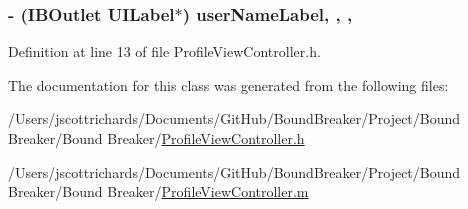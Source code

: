\subsubsection[{user\+Name\+Label}]{\setlength{\rightskip}{0pt plus 5cm}-\/ (I\+B\+Outlet U\+I\+Label$\ast$) user\+Name\+Label\hspace{0.3cm}{\ttfamily [read]}, {\ttfamily [write]}, {\ttfamily [nonatomic]}, {\ttfamily [weak]}}\label{interface_profile_view_controller_ad53862803c533a8fa1a4f99299db3424}


Definition at line 13 of file Profile\+View\+Controller.\+h.



The documentation for this class was generated from the following files\+:\begin{DoxyCompactItemize}
\item 
/\+Users/jscottrichards/\+Documents/\+Git\+Hub/\+Bound\+Breaker/\+Project/\+Bound Breaker/\+Bound Breaker/\hyperlink{_profile_view_controller_8h}{Profile\+View\+Controller.\+h}\item 
/\+Users/jscottrichards/\+Documents/\+Git\+Hub/\+Bound\+Breaker/\+Project/\+Bound Breaker/\+Bound Breaker/\hyperlink{_profile_view_controller_8m}{Profile\+View\+Controller.\+m}\end{DoxyCompactItemize}
